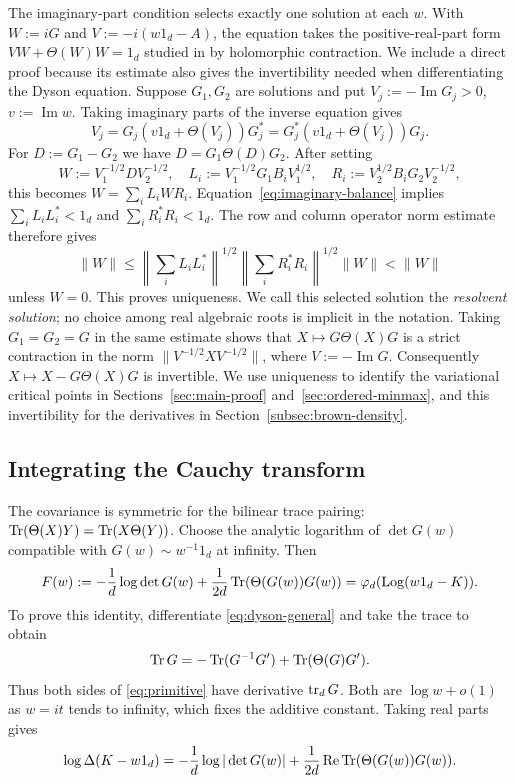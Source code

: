 The imaginary-part condition selects exactly one solution at each $w$.
With $W:=iG$ and $V:=-i(w1_d-A)$, the equation takes the positive-real-part form $VW+\Theta(W)W=1_d$ studied in \cite[Theorem 2.1 and Section 3]{HRFS07} by holomorphic contraction.
We include a direct proof because its estimate also gives the invertibility needed when differentiating the Dyson equation.
Suppose $G_1,G_2$ are solutions and put $V_j:=-\operatorname{Im}G_j>0$, $v:=\operatorname{Im}w$.
Taking imaginary parts of the inverse equation gives
\begin{equation}\label{eq:imaginary-balance}
 V_j=G_j(v1_d+\Theta(V_j))G_j^*
     =G_j^*(v1_d+\Theta(V_j))G_j.
\end{equation}
For $D:=G_1-G_2$ we have $D=G_1\Theta(D)G_2$.
After setting
\[
 W:=V_1^{-1/2}DV_2^{-1/2},\quad
 L_i:=V_1^{-1/2}G_1B_iV_1^{1/2},\quad
 R_i:=V_2^{1/2}B_iG_2V_2^{-1/2},
\]
this becomes $W=\sum_iL_iWR_i$.
Equation~\eqref{eq:imaginary-balance} implies $\sum_iL_iL_i^*<1_d$ and $\sum_iR_i^*R_i<1_d$.
The row and column operator norm estimate therefore gives
\[
 \|W\|\leq
 \left\|\sum_iL_iL_i^*\right\|^{1/2}
 \left\|\sum_iR_i^*R_i\right\|^{1/2}\|W\|<\|W\|
\]
unless $W=0$.
This proves uniqueness.
We call this selected solution the \emph{resolvent solution}; no choice among real algebraic roots is implicit in the notation.
Taking $G_1=G_2=G$ in the same estimate shows that $X\mapsto G\Theta(X)G$ is a strict contraction in the norm $\|V^{-1/2}XV^{-1/2}\|$, where $V:=-\operatorname{Im}G$.
Consequently $X\mapsto X-G\Theta(X)G$ is invertible.
We use uniqueness to identify the variational critical points in Sections~\ref{sec:main-proof} and~\ref{sec:ordered-minmax}, and this invertibility for the derivatives in Section~\ref{subsec:brown-density}.

\subsection{Integrating the Cauchy transform}
The covariance is symmetric for the bilinear trace pairing: $\operatorname{Tr}(\Theta(X)Y)=\operatorname{Tr}(X\Theta(Y))$.
Choose the analytic logarithm of $\det G(w)$ compatible with $G(w)\sim w^{-1}1_d$ at infinity.
Then
\begin{equation}\label{eq:primitive}
 F(w):=-\frac1d\log\det G(w)
        +\frac1{2d}\operatorname{Tr}(\Theta(G(w))G(w))
      =\varphi_d(\operatorname{Log}(w1_d-K)).
\end{equation}
To prove this identity, differentiate \eqref{eq:dyson-general} and take the trace to obtain
\[
 \operatorname{Tr} G=-\operatorname{Tr}(G^{-1}G')+\operatorname{Tr}(\Theta(G)G').
\]
Thus both sides of \eqref{eq:primitive} have derivative $\operatorname{tr}_dG$.
Both are $\log w+o(1)$ as $w=it$ tends to infinity, which fixes the additive constant.
Taking real parts gives
\begin{equation}\label{eq:selfadjoint-potential}
 \log\Delta(K-w1_d)
 =-\frac1d\log|\det G(w)|
       +\frac1{2d}\operatorname{Re}\operatorname{Tr}(\Theta(G(w))G(w)).
\end{equation}

